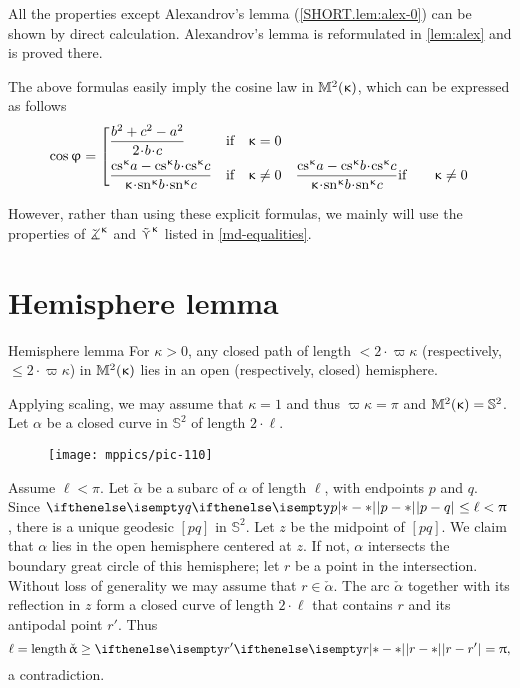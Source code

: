 All the properties except Alexandrov's lemma (\ref{SHORT.lem:alex-0}) can be shown by direct calculation. Alexandrov's lemma is reformulated in \ref{lem:alex} and is proved there.




The above formulas easily imply  the cosine law in $\mathbb{M}_{{}}^{2}({\upkappa})$, which can be expressed as follows
\[\cos\phi
=\left[\begin{aligned}
&\frac{b^2+c^2-a^2}{2\cdot b\cdot c}
&\text{if}&\quad \kappa=0
\\
&\frac{\cs\kappa a-\cs\kappa b\cdot\cs\kappa c}{\kappa\cdot\sn\kappa b\cdot\sn\kappa c}
&\text{if}&\quad \kappa\not=0
&\frac{\cs\kappa a-\cs\kappa b\cdot\cs\kappa c}{\kappa\cdot\sn\kappa b\cdot\sn\kappa c}
&\text{if}&\quad \kappa\not=0
\end{aligned}\right.\]

However, rather than using these explicit formulas,  we mainly will use
the properties of $\tangle\mc\kappa$ and $\mathop{\tilde\curlyvee}\nolimits^{\upkappa}$ listed in \ref{md-equalities}.

\section{Hemisphere lemma}\label{curves-in-model}

\begin{thm}{Hemisphere lemma}
\label{lem:hemisphere}
For $\kappa>0$, any closed path of length $<2\cdot \varpi\kappa$ (respectively, $\le2\cdot \varpi\kappa$) in $\mathbb{M}_{{}}^{2}({\upkappa})$ lies in an open (respectively, closed) hemisphere. 
\end{thm}

 Applying scaling, we may assume that $\kappa=1$ and thus $\varpi\kappa=\pi$ and $\mathbb{M}_{{}}^{2}({\upkappa})=\mathbb{S}^2$.
Let $\alpha$ be a closed curve in $\mathbb{S}^2$ of length $2\cdot\ell$.



\begin{wrapfigure}{o}{35 mm}
\vskip-0mm
\centering
\texttt{[image: mppics/pic-110]}
\end{wrapfigure}

Assume $\ell<\pi$.
Let $\check\alpha$ be a subarc of $\alpha$ of length $\ell$, with endpoints $p$ and $q$. 
Since $\dist{p}{q}{}\le\ell<\pi$, there is a unique geodesic $[pq]$ in $\mathbb{S}^2$.  
Let $z$ be the midpoint of  $[pq]$.  
We claim that $\alpha$ lies in the open hemisphere centered at $z$.  
If not, $\alpha$ intersects the boundary  great circle of this hemisphere; let $r$ be a point in the intersection.
Without loss of generality we may assume that $r\in\check\alpha$. 
The arc $\check\alpha$ together with its reflection in $z$ form a closed curve of length $2\cdot \ell$ that contains $r$ and its antipodal point $r'$.
Thus 
\[\ell=\length \check\alpha\ge \dist{r}{r'}{}=\pi,\] 
a contradiction.

